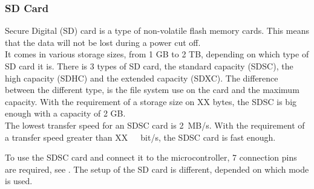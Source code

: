 \subsubsection{SD Card} \label{SDcard}
Secure Digital (SD) card is a type of non-volatile flash memory cards. This means that the data will not be lost during a power cut off.\\
%
It comes in various storage sizes, from 1 GB to 2 TB, depending on which type of SD card it is. There is 3 types of SD card, the standard capacity (SDSC), the high capacity (SDHC) and the extended capacity (SDXC). The  difference between the different type, is the file system use on the card and the maximum capacity. With the requirement of a storage size on XX bytes, the SDSC is big enough with a capacity of 2 GB.\\
%
The lowest transfer speed for an SDSC card is \si{2 MB/s}. With the requirement of a transfer speed greater than \si{XX\ bit/s}, the SDSC card is fast enough. 

To use the SDSC card and connect it to the microcontroller, 7 connection pins are required, see . The setup of the SD card is different, depended on which mode is used.

